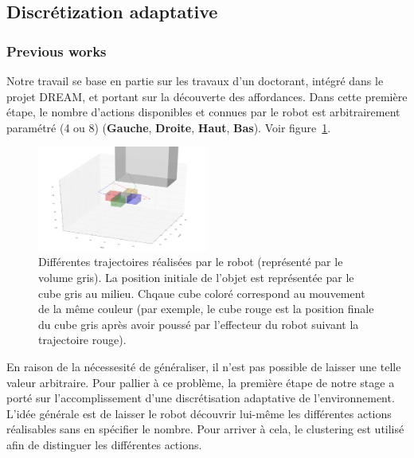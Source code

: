 \documentclass{llncs}
\begin{document}




\subsection{Discrétization adaptative}



\subsubsection{Previous works}

Notre travail se base en partie sur les travaux d'un doctorant, intégré dans le projet DREAM, et portant sur la découverte des affordances. Dans cette première étape, le nombre d'actions disponibles et connues par le robot est arbitrairement paramétré (4 ou 8) (\textbf{Gauche}, \textbf{Droite}, \textbf{Haut}, \textbf{Bas}). Voir figure~\ref{fig:trajectories}.

\begin{figure}
	\centering
	\includegraphics[width=0.5\textwidth]{figures/trajectories}
	\caption{Différentes trajectoires réalisées par le robot (représenté par le volume gris). La position initiale de l'objet est représentée par le cube gris au milieu. Chqaue cube coloré correspond au mouvement de la même couleur (par exemple, le cube rouge est la position finale du cube gris après avoir poussé par l'effecteur du robot suivant la trajectoire rouge).}
	\label{fig:trajectories}
\end{figure}

En raison de la nécessesité de généraliser, il n'est pas possible de laisser une telle valeur arbitraire. Pour pallier à ce problème, la première étape de notre stage a porté sur l'accomplissement d'une discrétisation adaptative de l'environnement. L'idée générale est de laisser le robot découvrir lui-même les différentes actions réalisables sans en spécifier le nombre. Pour arriver à cela, le clustering est utilisé afin de distinguer les différentes actions. 
\end{document}

